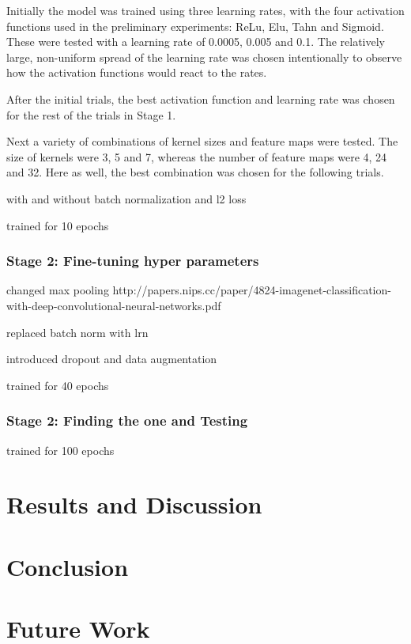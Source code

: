 \documentclass[]{article}
\begin{document}
Initially the model was trained using three learning rates, with the four activation functions used in the preliminary experiments: ReLu, Elu, Tahn and Sigmoid. These were tested with a learning rate of 0.0005, 0.005 and 0.1. The relatively large, non-uniform spread of the learning rate was chosen intentionally to observe how the activation functions would react to the rates.

After the initial trials, the best activation function and learning rate was chosen for the rest of the trials in Stage 1. 

Next a variety of combinations of kernel sizes and feature maps were tested. The size of kernels were 3, 5 and 7, whereas the number of feature maps were 4, 24 and 32. Here as well, the best combination was chosen for the following trials.


with and without batch normalization and l2 loss

trained for 10 epochs


\subsubsection{Stage 2: Fine-tuning hyper parameters}


changed max pooling
http://papers.nips.cc/paper/4824-imagenet-classification-with-deep-convolutional-neural-networks.pdf

replaced batch norm with lrn

introduced dropout and data augmentation

trained for 40 epochs


\subsubsection{Stage 2: Finding the one and Testing}

trained for 100 epochs
 
 
\section{Results and Discussion}

\section{Conclusion}

\section{Future Work}


\clearpage
\medskip


\end{document}
